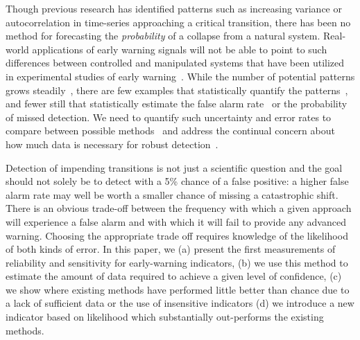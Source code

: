 \documentclass{pnastwo}
\begin{document}
\begin{article}
Though previous research has identified patterns such as increasing variance or autocorrelation
in time-series approaching a critical transition,
there has been no method for forecasting the \emph{probability} of a collapse from a natural system.
Real-world applications of early warning signals will not be able to point to such differences between controlled and
manipulated systems that have been utilized in experimental studies of early warning~\cite{Drake2010, Carpenter2011}⁠.
While the number of potential patterns grows steadily~\cite{Carpenter2006, Dakos2008, Guttal2008, Guttal2008a, Dakos2011}, %
there are few examples that statistically quantify the patterns~\cite{Dakos2008, Dakos2011},⁠
and fewer still that statistically estimate the false alarm rate~\cite{Dakos2008} or 
the probability of missed detection⁠. 
We need to quantify such uncertainty and error rates to compare between possible methods~\cite{Contamin2009}
and address the continual concern about how much data is necessary⁠ for robust detection~\cite{Scheffer2001, Dakos2008, Carpenter2011, Scheffer2010, Inman2011}.  

Detection of impending transitions is not just a scientific question 
and the goal should not solely be to detect with a 5\% chance of a false positive:
a higher false alarm rate may well be  worth a smaller chance of  missing a catastrophic shift. 
There is an obvious trade-off between the frequency with which a given approach will experience a false alarm and
with which it will fail to provide any advanced warning. 
Choosing the appropriate trade off requires knowledge of the likelihood of both kinds of error.
In this paper, we
(a) present the first measurements of reliability and sensitivity for early-warning indicators, 
(b) we use this method to estimate the amount of data required to achieve a given level of confidence,  
(c) we show where existing methods have performed little better than chance due to a lack of sufficient data or the use of insensitive indicators 
(d) we introduce a new indicator based on likelihood which substantially out-performs the existing methods.     


\end{article}
\end{document}

